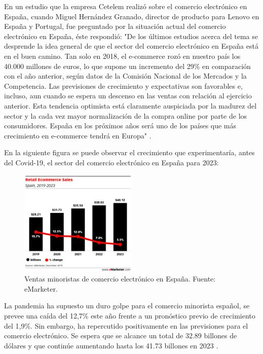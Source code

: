En un estudio que la empresa Cetelem realizó sobre el comercio electrónico en España, cuando Miguel Hernández Granado, director de producto para Lenovo en España y Portugal, fue preguntado por la situación actual del comercio electrónico en España, éste respondió: "De los últimos estudios acerca del tema se desprende la idea general de que el sector del comercio electrónico en España está en el buen camino. Tan solo en 2018, el e-commerce rozó en nuestro país los 40.000 millones de euros, lo que supone un incremento del 29\% en comparación con el año anterior, según datos de la Comisión Nacional de los Mercados y la Competencia. Las previsiones de crecimiento y expectativas son favorables e, incluso, aun cuando se espera un descenso en las ventas con relación al ejercicio anterior. Esta tendencia optimista está claramente auspiciada por la madurez del sector y la cada vez mayor normalización de la compra online por parte de los consumidores. España en los próximos años será uno de los países que más crecimiento en e-commerce tendrá en Europa" . 

En la siguiente figura se puede observar el crecimiento que experimentaría, antes del Covid-19, el sector del comercio electrónico en España para 2023:

\begin{figure}[ht]
	\begin{center}
		\includegraphics[width = 0.50\textwidth]{Figuras/ecommerce-españa-crecimiento-predicción-.png}
	\end{center}
	\caption{\label{fig:retailSpain} Ventas minoristas de comercio electrónico en España. Fuente: eMarketer.}
\end{figure}

\newpage

La pandemia ha supuesto un duro golpe para el comercio minorista español, se prevee una caída del 12,7\% este año frente a un pronóstico previo de crecimiento del 1,9\%. Sin embargo, ha repercutido positivamente en las previsiones para el comercio electrónico. Se espera que se alcance un total de 32.89 billones de dólares y que continúe aumentando hasta los 41.73 billones en 2023 . 

